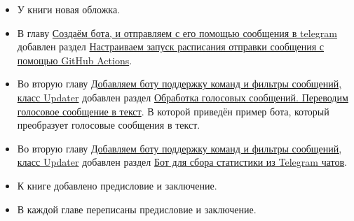 \documentclass[
]{book}
\providecommand{\tightlist}{%
  \setlength{\itemsep}{0pt}\setlength{\parskip}{0pt}}
\begin{document}
\begin{itemize}
\tightlist
\item
  У книги новая обложка.
\item
  В главу \hyperref[ux441ux43eux437ux434ux430ux451ux43c-ux431ux43eux442ux430-ux438-ux43eux442ux43fux440ux430ux432ux43bux44fux435ux43c-ux441-ux435ux433ux43e-ux43fux43eux43cux43eux449ux44cux44e-ux441ux43eux43eux431ux449ux435ux43dux438ux44f-ux432-telegram]{Создаём бота, и отправляем с его помощью сообщения в telegram} добавлен раздел \hyperref[ux43dux430ux441ux442ux440ux430ux438ux432ux430ux435ux43c-ux437ux430ux43fux443ux441ux43a-ux440ux430ux441ux43fux438ux441ux430ux43dux438ux44f-ux43eux442ux43fux440ux430ux432ux43aux438-ux441ux43eux43eux431ux449ux435ux43dux438ux44f-ux441-ux43fux43eux43cux43eux449ux44cux44e-github-actions]{Настраиваем запуск расписания отправки сообщения с помощью GitHub Actions}.
\item
  Во вторую главу \hyperref[ux434ux43eux431ux430ux432ux43bux44fux435ux43c-ux431ux43eux442ux443-ux43fux43eux434ux434ux435ux440ux436ux43aux443-ux43aux43eux43cux430ux43dux434-ux438-ux444ux438ux43bux44cux442ux440ux44b-ux441ux43eux43eux431ux449ux435ux43dux438ux439-ux43aux43bux430ux441ux441-updater]{Добавляем боту поддержку команд и фильтры сообщений, класс Updater} добавлен раздел \hyperref[ux43eux431ux440ux430ux431ux43eux442ux43aux430-ux433ux43eux43bux43eux441ux43eux432ux44bux445-ux441ux43eux43eux431ux449ux435ux43dux438ux439.-ux43fux435ux440ux435ux432ux43eux434ux438ux43c-ux433ux43eux43bux43eux441ux43eux432ux43eux435-ux441ux43eux43eux431ux449ux435ux43dux438ux435-ux432-ux442ux435ux43aux441ux442]{Обработка голосовых сообщений. Переводим голосовое сообщение в текст}. В которой приведён пример бота, который преобразует голосовые сообщения в текст.
\item
  Во вторую главу \hyperref[ux434ux43eux431ux430ux432ux43bux44fux435ux43c-ux431ux43eux442ux443-ux43fux43eux434ux434ux435ux440ux436ux43aux443-ux43aux43eux43cux430ux43dux434-ux438-ux444ux438ux43bux44cux442ux440ux44b-ux441ux43eux43eux431ux449ux435ux43dux438ux439-ux43aux43bux430ux441ux441-updater]{Добавляем боту поддержку команд и фильтры сообщений, класс Updater} добавлен раздел \hyperref[ux431ux43eux442-ux434ux43bux44f-ux441ux431ux43eux440ux430-ux441ux442ux430ux442ux438ux441ux442ux438ux43aux438-ux438ux437-telegram-ux447ux430ux442ux43eux432]{Бот для сбора статистики из Telegram чатов}.
\item
  К книге добавлено предисловие и заключение.
\item
  В каждой главе переписаны предисловие и заключение.
\end{itemize}
\end{document}
